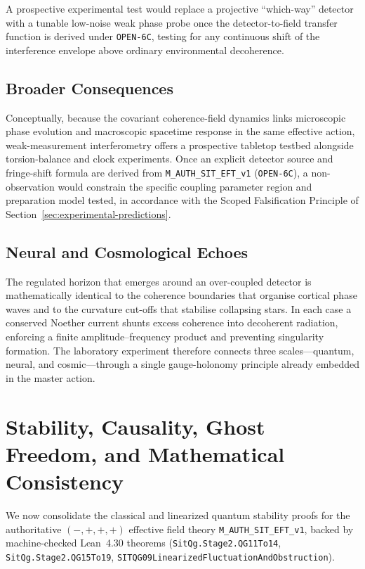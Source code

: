 A prospective experimental test would replace a projective
``which-way'' detector with a tunable low-noise weak phase probe once
the detector-to-field transfer function is derived under
\texttt{OPEN-6C}, testing for any continuous shift of the interference
envelope above ordinary environmental decoherence.

\subsection{Broader Consequences}

Conceptually, because the covariant coherence-field dynamics links
microscopic phase evolution and macroscopic spacetime response in the
same effective action, weak-measurement interferometry offers a
prospective tabletop testbed alongside torsion-balance and clock
experiments. Once an explicit detector source and fringe-shift formula
are derived from \texttt{M\_AUTH\_SIT\_EFT\_v1} (\texttt{OPEN-6C}),
a non-observation would constrain the specific coupling parameter
region and preparation model tested, in accordance with the Scoped
Falsification Principle of Section~\ref{sec:experimental-predictions}.

\subsection{Neural and Cosmological Echoes}

The regulated horizon that emerges around an over-coupled detector
is mathematically identical to the coherence boundaries that
organise cortical phase waves and to the curvature cut-offs that
stabilise collapsing stars.  In each case a conserved Noether
current shunts excess coherence into decoherent radiation,
enforcing a finite amplitude--frequency product and preventing
singularity formation.  The laboratory experiment therefore
connects three scales---quantum, neural, and cosmic---through a single
gauge-holonomy principle already embedded in the master action.



\section{Stability, Causality, Ghost Freedom, and Mathematical Consistency}
\label{sec:stability-causality}

We now consolidate the classical and linearized quantum stability proofs for the authoritative $(-,+,+,+)$ effective field theory \texttt{M\_AUTH\_SIT\_EFT\_v1}, backed by machine-checked Lean~4.30 theorems (\texttt{SitQg.Stage2.QG11To14}, \texttt{SitQg.Stage2.QG15To19}, \texttt{SITQG09\allowbreak{}Linearized\allowbreak{}Fluctuation\allowbreak{}And\allowbreak{}Obstruction}).

